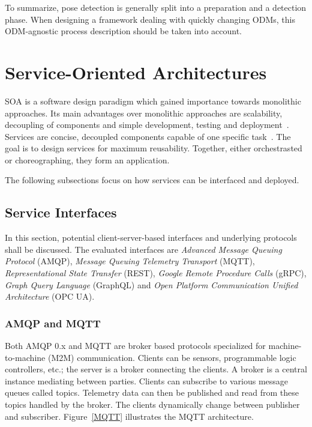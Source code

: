 To summarize, pose detection is generally split into a preparation and a detection phase. When designing a framework dealing with quickly changing ODMs, this ODM-agnostic process description should be taken into account.

\section{Service-Oriented Architectures}
SOA is a software design paradigm which gained importance towards monolithic approaches. Its main advantages over monolithic approaches are scalability, decoupling of components and simple development, testing and deployment~\cite{Richards2015MicroservicesArchitecture}. Services are concise, decoupled components capable of one specific task~\cite{Newman2015BuildingMicroservices}. The goal is to design services for maximum reusability. Together, either orchestrasted or choreographing, they form an application.

The following subsections focus on how services can be interfaced and deployed.

\subsection {Service Interfaces}
\label{serviceinterfaces}
In this section, potential client-server-based interfaces and underlying protocols shall be discussed. The evaluated interfaces are \textit{Advanced Message Queuing Protocol} (AMQP), \textit{Message Queuing Telemetry Transport} (MQTT), \textit{Representational State Transfer} (REST), \textit{Google Remote Procedure Calls} (gRPC), \textit{Graph Query Language} (GraphQL) and \textit{Open Platform Communication Unified Architecture} (OPC UA).

\subsubsection{AMQP and MQTT}
Both AMQP 0.x and MQTT are broker based protocols specialized for machine-to-machine (M2M) communication. Clients can be sensors, programmable logic controllers, etc.; the server is a broker connecting the clients. A broker is a central instance mediating between parties. Clients can subscribe to various message queues called topics. Telemetry data can then be published and read from these topics handled by the broker. The clients dynamically change between publisher and subscriber. Figure~\ref{MQTT} illustrates the MQTT architecture.~\cite{Banks2014MQTT2018}

